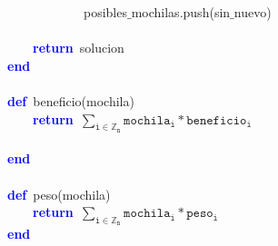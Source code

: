 \mbox{}\ \ \ \ \ \ \ \ \ \ \ \ posibles$\_$mochilas\textcolor{BrickRed}{.}push\textcolor{BrickRed}{(}sin$\_$nuevo\textcolor{BrickRed}{)} \\
\mbox{}\ \ \ \ \ \ \ \  \\
\mbox{}\ \ \ \ \textbf{\textcolor{Blue}{return}}\ solucion \\
\mbox{}\textbf{\textcolor{Blue}{end}} \\
\mbox{} \\
\mbox{}\textbf{\textcolor{Blue}{def}}\ beneficio\textcolor{BrickRed}{(}mochila\textcolor{BrickRed}{)} \\
\mbox{}\ \ \ \ \textbf{\textcolor{Blue}{return}}\ $\mathtt{\sum_{i \in \mathbb{Z}_n} mochila_i * beneficio_i}$ \\ \\
\mbox{}\textbf{\textcolor{Blue}{end}} \\
\mbox{} \\
\mbox{}\textbf{\textcolor{Blue}{def}}\ peso\textcolor{BrickRed}{(}mochila\textcolor{BrickRed}{)} \\
\mbox{}\ \ \ \ \textbf{\textcolor{Blue}{return}}\ $\mathtt{\sum_{i \in \mathbb{Z}_n} mochila_i * peso_i}$ \\
\mbox{}\textbf{\textcolor{Blue}{end}} \\
\mbox{} \\
\mbox{}\ \ \ \ \ \ \ \ \ \ \ \  \\
\mbox{}
